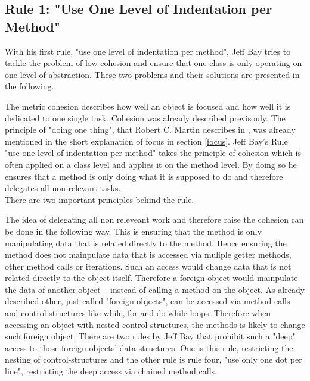 \subsection*{Rule 1: "Use One Level of Indentation per Method"}
\label{describe:rule1}
With his first rule, "use one level of indentation per method", Jeff Bay tries to tackle the problem of low cohesion and ensure that one class is only operating on one level of abstraction. These two problems and their solutions are presented in the following. 

The metric cohesion describes how well an object is focused and how well it is dedicated to one single task. Cohesion was already described previsouly. The principle of "doing one thing", that Robert C. Martin describes in \cite{cc}, was already mentioned in the short explanation of focus in section \ref{focus}. Jeff Bay's Rule  "use one level of indentation per method" takes the principle of cohesion which is often applied on a class level and applies it on the method level. By doing so he ensures that a method is only doing what it is supposed to do and therefore delegates all non-relevant tasks. \\

There are two important principles behind the rule. 

The idea of delegating all non releveant work and therefore raise the cohesion can be done in the following way.
This is ensuring that the method is only manipulating data that is related directly to the method. Hence ensuring the method does not mainpulate data that is accessed via muliple getter methods, other method calls or iterations. Such an access would change data that is not related directly to the object itself. Therefore a foreign object would mainpulate the data of another object -- instead of calling a method on the object. As already described other, just called "foreign objects", can be accessed via method calls and control structures like while, for and do-while loops. Therefore when accessing an object with nested control structures, the methods is likely to change such foreign object. There are two rules by Jeff Bay that prohibit such a "deep" access to those foreign objects' data structures. One is this rule, restricting the nesting of control-structures and the other rule is rule four, "use only one dot per line", restricting the deep access via chained method calls. \\

